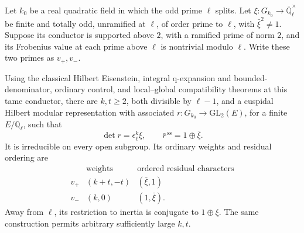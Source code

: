 \begin{srlemma}
\label{lem:sr-mixed-hilbert-seed}
Let \(k_0\) be a real quadratic field in which the odd prime
\(\ell\) splits. Let \(\xi:G_{k_0}\to\overline{\mathbb Q}_\ell^\times\)
be finite and totally odd, unramified at \(\ell\), of order prime
to \(\ell\), with \(\bar\xi^2\ne1\).
Suppose its conductor is supported above \(2\), with a ramified
prime of norm \(2\), and its Frobenius value at each prime above
\(\ell\) is nontrivial modulo \(\ell\).
Write these two primes as \(v_+,v_-\).

Using the classical Hilbert Eisenstein, integral q-expansion and
bounded-denominator, ordinary control, and local--global
compatibility theorems at this tame conductor,
there are \(k,t\ge2\), both divisible by \(\ell-1\), and a
cuspidal Hilbert modular representation with associated
\(r:G_{k_0}\to\mathrm{GL}_2(E)\), for a finite
\(E/\mathbb Q_\ell\), such that
\[
 \det r=\epsilon_\ell^k\xi,\qquad
 \bar r^{\,\mathrm{ss}}=1\oplus\bar\xi.
\]
It is irreducible on every open subgroup. Its ordinary weights
and residual ordering are
\[
 \begin{array}{c|c|c}
 &\text{weights}&\text{ordered residual characters}\\\hline
 v_+&(k+t,-t)&(\bar\xi,1)\\
 v_-&(k,0)&(1,\bar\xi).
 \end{array}
\]
Away from \(\ell\), its restriction to inertia is conjugate to
\(1\oplus\xi\).
The same construction permits arbitrary sufficiently large \(k,t\).
\end{srlemma}
